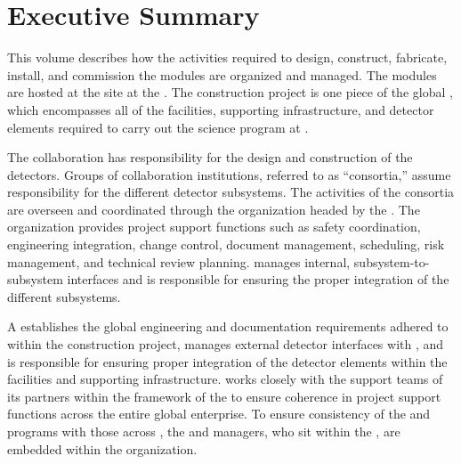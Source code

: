 \chapter{Executive Summary}

\label{vl:tc-execsum}




This volume describes how the activities required to design,
construct, fabricate, install, and commission the 
 modules are organized and managed. The  modules
are hosted at the  site at the . The
  construction project is one piece of the
global , which encompasses all of the facilities,
supporting infrastructure, and detector elements required to carry out
the  science program at .
      
The  collaboration has  responsibility for the design 
and construction of the  detectors.  Groups of collaboration 
institutions, referred to as ``consortia,'' assume responsibility for 
the different detector subsystems.  The activities of the consortia are 
overseen and coordinated through the   organization 
headed by the  .  The  organization 
provides project support functions such as safety coordination, 
engineering integration, change control, document management, scheduling, 
risk management, and technical review planning.    
manages internal, subsystem-to-subsystem interfaces and is responsible 
for ensuring the proper integration of the different subsystems.   

A  establishes the global engineering
and documentation requirements adhered to within the  
 construction project, manages external  detector 
interfaces with , and is responsible for ensuring proper 
integration of the  detector elements within the facilities 
and supporting infrastructure.
  works closely with the support teams of its 
 partners within the framework of the  to 
ensure coherence in project support functions across the entire global 
enterprise.  To ensure consistency of the   
and  programs with those across , the 
  and  managers, who sit within 
the , are embedded within the   
organization.  


